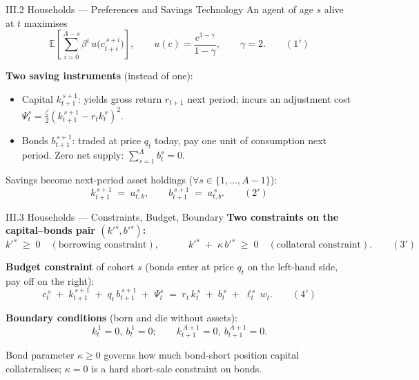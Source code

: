 \documentclass[aspectratio=169,11pt]{beamer}
\newcommand{\emphc}[1]{\textcolor{harvardcrimson}{#1}}
\newcommand{\E}[1]{\mathbb{E}\!\left[#1\right]}
\begin{document}
\begin{frame}{III.2 Households --- Preferences and Savings Technology}
\small
An agent of age $s$ alive at $t$ maximises
\[
\E{\sum_{i=0}^{A-s} \beta^i \,u\!\bigl(c_{t+i}^{\,s+i}\bigr)}, \qquad u(c) = \frac{c^{1-\gamma}}{1-\gamma}, \qquad \gamma = 2. \qquad (1')
\]

\vspace{0.3em}
\textbf{Two saving instruments} (instead of one):
\begin{itemize}\itemsep2pt
    \item \emphc{Capital} $k_{t+1}^{\,s+1}$: yields gross return $r_{t+1}$ next period; incurs an \emphc{adjustment cost} $\Psi_t^s = \tfrac{\zeta}{2}(k_{t+1}^{\,s+1} - r_t k_t^{\,s})^2$.
    \item \emphc{Bonds} $b_{t+1}^{\,s+1}$: traded at price $q_t$ today, pay one unit of consumption next period. \emphc{Zero net supply}: $\sum_{s=1}^A b_t^s = 0$.
\end{itemize}

\vspace{0.3em}
Savings become next-period asset holdings ($\forall s \in \{1, \ldots, A-1\}$):
\[
k_{t+1}^{\,s+1} \;=\; a_{t,k}^{\,s}, \qquad b_{t+1}^{\,s+1} \;=\; a_{t,b}^{\,s}. \qquad (2')
\]
\end{frame}


\begin{frame}{III.3 Households --- Constraints, Budget, Boundary}
\small
\textbf{Two constraints on the capital--bonds pair $(k'^s, b'^s)$:}
\[
k'^s \;\ge\; 0 \quad (\text{borrowing constraint}), \qquad\quad
k'^s \;+\; \kappa\, b'^s \;\ge\; 0 \quad (\text{collateral constraint}).
\qquad (3')
\]

\vspace{0.4em}
\textbf{Budget constraint} of cohort $s$ (bonds enter at price $q_t$ on the left-hand side, pay off on the right):
\[
c_t^{\,s} \;+\; k_{t+1}^{\,s+1} \;+\; q_t\, b_{t+1}^{\,s+1} \;+\; \Psi_t^s
\;=\; r_t\, k_t^{\,s} \;+\; b_t^{\,s} \;+\; \ell_t^{\,s}\, w_t.
\qquad (4')
\]

\vspace{0.4em}
\textbf{Boundary conditions} (born and die without assets):
\[
k_t^{\,1} = 0,\ b_t^{\,1} = 0; \qquad k_{t+1}^{\,A+1} = 0,\ b_{t+1}^{\,A+1} = 0.
\]

\vspace{0.3em}
{\footnotesize Bond parameter $\kappa \ge 0$ governs how much bond-short position capital collateralises; $\kappa = 0$ is a \emphc{hard} short-sale constraint on bonds.}
\end{frame}
\end{document}
